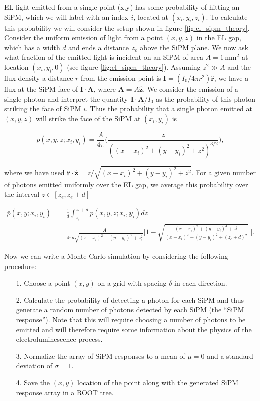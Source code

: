 \documentclass[10pt]{article}
\begin{document}
\noindent EL light emitted from a single point (x,y) has some probability of hitting an SiPM, which we will label with an index $i$, located at $(x_i,y_i,z_i)$.  To calculate this probability we will
consider the setup shown in figure \ref{fig:el_sipm_theory}.  Consider the uniform emission of light from a point
$(x,y,z)$ in the EL gap, which has a width $d$ and ends a distance $z_e$ above the SiPM plane.  We now ask what fraction of the emitted light is incident on an SiPM of area 
$A = 1 \, \mathrm{mm}^2$ at location $(x_{i},y_{i},0)$ (see figure \ref{fig:el_sipm_theory}).  Assuming $z^{2} \gg A$ and the flux density a distance $r$ from the emission point is
$\mathbf{{I}} = (I_{0}/4\pi r^{2})\mathbf{\hat{r}}$, we have a flux at the SiPM face of 
$\mathbf{I} \cdot \mathbf{A}$, where $\mathbf{A} = A\mathbf{\hat{z}}$.  We consider the emission of a single photon and
interpret the quantity $\mathbf{I} \cdot \mathbf{A}/I_{0}$ as the probability of this photon striking the face of SiPM $i$.  Thus the probability
that a single photon emitted at $(x,y,z)$ will strike the face of the SiPM at $(x_{i},y_{i})$ is

\begin{equation}
p(x,y,z;x_{i},y_{i}) = \frac{A}{4\pi}\Biggl(\frac{z}{((x-x_{i})^{2} + (y-y_{i})^{2} + z^{2})^{3/2}}\Biggr),
\end{equation}

\noindent where we have used $\mathbf{\hat{r}}\cdot\mathbf{\hat{z}} = z/\sqrt{(x-x_{i})^{2} + (y-y_{i})^{2} + z^{2}}$.
For a given number of photons emitted uniformly over the EL gap, we average this probability over the interval
$z \in [z_{e},z_{e}+d]$

\begin{equation}\label{eqn_detprob}
\begin{split}
\bar{p}(x,y;x_{i},y_{i}) = & \frac{1}{d}\int_{z_{e}}^{z_{e}+d}p(x,y,z;x_{i},y_{i})dz\\
= & \frac{A}{4\pi d\sqrt{(x-x_{i})^{2}+(y-y_{i})^{2} + z_{e}^{2}}}\Biggl[1-\sqrt{\frac{(x-x_{i})^{2}+(y-y_{i})^{2}+z_{e}^{2}}{(x-x_{i})^{2}+(y-y_{i})^{2}+(z_{e}+d)^{2}}}\,\,\Biggr].
\end{split}
\end{equation}

\noindent Now we can write a Monte Carlo simulation by considering the following procedure:

\begin{enumerate}
	\item[1.] Choose a point $(x,y)$ on a grid with spacing $\delta$ in each direction.
	\item[2.] Calculate the probability of detecting a photon for each SiPM and thus generate a random number of photons detected by each SiPM (the ``SiPM response'').  Note that this will require choosing a number of
	photons to be emitted and will therefore require some information about the physics of the electroluminescence process.
	\item[3.] Normalize the array of SiPM responses to a mean of $\mu = 0$ and a standard deviation of $\sigma = 1$.
	\item[4.] Save the $(x,y)$ location of the point along with the generated SiPM response array in a ROOT tree.
\end{enumerate}
\end{document}
